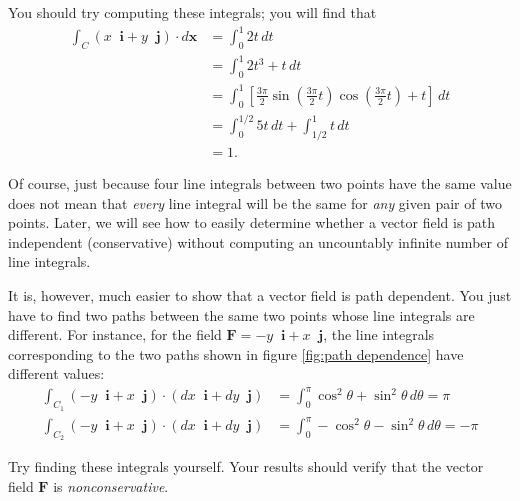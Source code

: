 \documentclass{myarticle}
\renewcommand{\vec}[1]{\mathbf{#1}}
\newcommand{\unitvector}[1]{
  \mathop{}\!\vec{#1}
}
\newcommand{\ih}{\unitvector{i}}
\newcommand{\jh}{\unitvector{j}}
\theoremstyle{nospace}
\newtheorem{old series theorem}{Theorem}
\newenvironment{series theorem}
{\begin{mdframed}\begin{old series theorem}}
    {\end{old series theorem}\end{mdframed}}
\begin{document}
You should try computing these integrals; you will find that
\begin{align*}
  \int_C \left(x \ih + y \jh\right) \cdot d\vec{x}
  &= \int_0^1 2t \,dt \\
  &= \int_0^1 2t^3 + t \,dt \\
  &= \int_0^1 \left[\frac{3\pi}{2} \sin\left(\frac{3\pi}{2}t\right)
    \cos\left(\frac{3\pi}{2}t\right) + t\right] \,dt \\
  &= \int_0^{1/2} 5t \,dt + \int_{1/2}^1 t \,dt \\
  &= 1.
\end{align*}

Of course, just because four line integrals between two points have
the same value does not mean that \textit{every} line integral will be
the same for \textit{any} given pair of two points. Later, we will see
how to easily determine whether a vector field is path independent
(conservative) without computing an uncountably infinite number of
line integrals.

It is, however, much easier to show that a vector field is path
dependent. You just have to find two paths between the same two points
whose line integrals are different. For instance, for the field
$\vec{F} = -y \ih + x \jh$, the line integrals corresponding to the
two paths shown in figure \ref{fig:path dependence} have different
values:
\begin{align*}
  \int_{C_1} \left(-y \ih + x \jh\right)
  \cdot \left(dx \ih + dy \jh\right)
  &= \int_0^\pi \cos^2 \theta + \sin^2 \theta \,d\theta = \pi \\
  \int_{C_2} \left(-y \ih + x \jh\right)
  \cdot \left(dx \ih + dy \jh\right)
  &= \int_0^\pi -\cos^2 \theta - \sin^2 \theta \,d\theta = -\pi
\end{align*}

Try finding these integrals yourself. Your results should verify that
the vector field $\vec{F}$ is \textit{nonconservative}.
\end{document}

